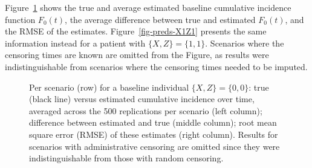\documentclass[
  letterpaper,
  DIV=11,
  numbers=noendperiod]{scrreprt}
\begin{document}
Figure~\ref{fig-preds-baseline} shows the true and average estimated
baseline cumulative incidence function \(F_0(t)\), the average
difference between true and estimated \(F_0(t)\), and the RMSE of the
estimates. Figure~\ref{fig-preds-X1Z1} presents the same information
instead for a patient with \(\{X, Z\} = \{1, 1\}\). Scenarios where the
censoring times are known are omitted from the Figure, as results were
indistinguishable from scenarios where the censoring times needed to be
imputed.

\begin{figure}


\caption{\label{fig-preds-baseline}Per scenario (row) for a baseline
individual \(\{X, Z\} = \{0,0\}\): true (black line) versus estimated
cumulative incidence over time, averaged across the 500 replications per
scenario (left column); difference between estimated and true (middle
column); root mean square error (RMSE) of these estimates (right
column). Results for scenarios with administrative censoring are omitted
since they were indistinguishable from those with random censoring.}

\end{figure}%
\end{document}
